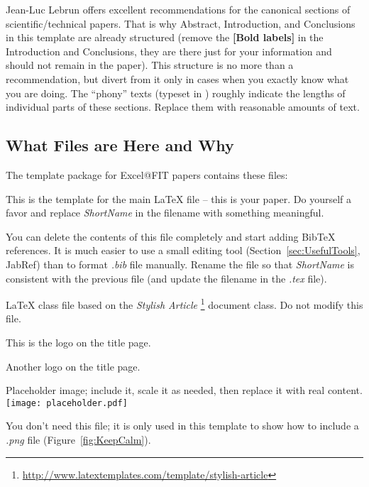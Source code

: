 \documentclass{ExcelAtFIT}
\begin{document}
Jean-Luc Lebrun \cite{Lebrun2011} offers excellent recommendations for the canonical sections of scientific/technical papers.  That is why Abstract, Introduction, and Conclusions in this template are already structured (remove the \textbf{[Bold labels]} in the Introduction and Conclusions, they are there just for your information and should not remain in the paper).  This structure is no more than a recommendation, but divert from it only in cases when you exactly know what you are doing.  The ``phony'' texts (typeset in ) roughly indicate the lengths of individual parts of these sections.  Replace them with reasonable amounts of text.

\subsection{What Files are Here and Why}
\label{sec:FilesInTemplate}

The template package for Excel@FIT papers contains these files:
\begin{description}[noitemsep]
	\item[2019-ExcelFIT-ShortName.tex] This is the template for the main \LaTeX{} file -- this is your paper.  Do yourself a favor and replace \textit{ShortName} in the filename with something meaningful.
	\item[2019-ExcelFIT-ShortName-bib.bib] You can delete the contents of this file completely and start adding BibTeX references.  It is much easier to use a small editing tool (Section~\ref{sec:UsefulTools}, JabRef) than to format \textit{.bib} file manually.  Rename the file so that \textit{ShortName} is consistent with the previous file (and update the filename in the \textit{.tex} file).
	\item[ExcelAtFIT.cls] \LaTeX{} class file based on the \emph{Stylish Article}%
	  \footnote{\url{http://www.latextemplates.com/template/stylish-article}} document class.  Do not modify this file.
	\item[ExcelAtFIT-logo.pdf] This is the logo on the title page.
	\item[VUT-FIT-logo.pdf] Another logo on the title page.
	\item[images/placeholder.pdf] Placeholder image; include it, scale it as needed, then replace it with real content.\\ \texttt{[image: placeholder.pdf]}
	\item[images/keep-calm.png] You don't need this file; it is only used in this template to show how to include a \textit{.png} file (Figure~\ref{fig:KeepCalm}).
\end{description}
\end{document}
